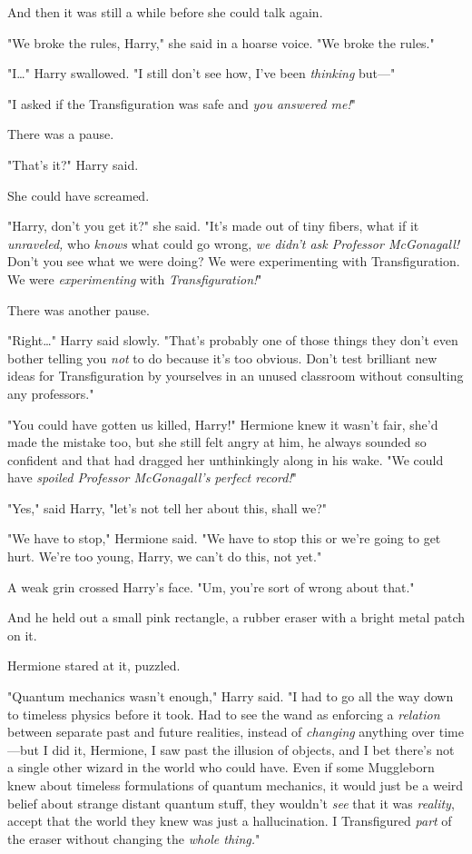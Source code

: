 And then it was still a while before she could talk again.

"We broke the rules, Harry," she said in a hoarse voice. "We broke the rules."

"I{\ldots}" Harry swallowed. "I still don't see how, I've been \emph{thinking}
but---"

"I asked if the Transfiguration was safe and \emph{you answered me!}"

There was a pause.

"That's it?" Harry said.

She could have screamed.

"Harry, don't you get it?" she said. "It's made out of tiny fibers, what if it
\emph{unraveled,} who \emph{knows} what could go wrong, \emph{we didn't ask
Professor McGonagall!} Don't you see what we were doing? We were experimenting
with Transfiguration. We were \emph{experimenting} with \emph{Transfiguration!}"

There was another pause.

"Right{\ldots}" Harry said slowly. "That's probably one of those things they
don't even bother telling you \emph{not} to do because it's too obvious. Don't
test brilliant new ideas for Transfiguration by yourselves in an unused
classroom without consulting any professors."

"You could have gotten us killed, Harry!" Hermione knew it wasn't fair, she'd
made the mistake too, but she still felt angry at him, he always sounded so
confident and that had dragged her unthinkingly along in his wake. "We could
have \emph{spoiled Professor McGonagall's perfect record!}"

"Yes," said Harry, "let's not tell her about this, shall we?"

"We have to stop," Hermione said. "We have to stop this or we're going to get
hurt. We're too young, Harry, we can't do this, not yet."

A weak grin crossed Harry's face. "Um, you're sort of wrong about that."

And he held out a small pink rectangle, a rubber eraser with a bright metal
patch on it.

Hermione stared at it, puzzled.

"Quantum mechanics wasn't enough," Harry said. "I had to go all the way down to
timeless physics before it took. Had to see the wand as enforcing a
\emph{relation} between separate past and future realities, instead of
\emph{changing} anything over time---but I did it, Hermione, I saw past the
illusion of objects, and I bet there's not a single other wizard in the world
who could have. Even if some Muggleborn knew about timeless formulations of
quantum mechanics, it would just be a weird belief about strange distant
quantum stuff, they wouldn't \emph{see} that it was \emph{reality}, accept that
the world they knew was just a hallucination. I Transfigured \emph{part} of the
eraser without changing the \emph{whole thing.}"

